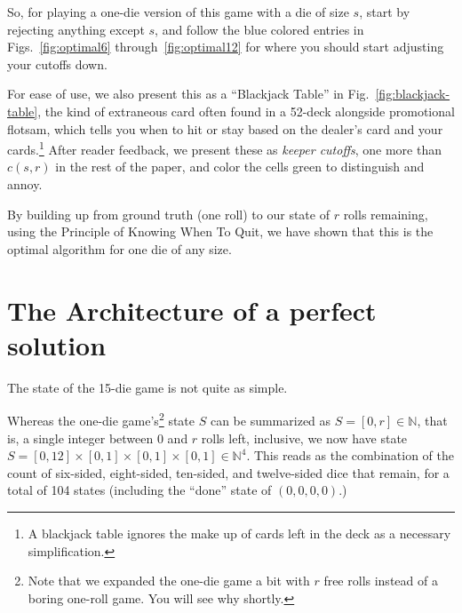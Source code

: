 \documentclass[11pt, oneside]{article} 	%
\begin{document}
So, for playing a one-die version of this game with a die of size $s$, start by rejecting anything except $s$, and follow the blue colored entries in Figs.~\ref{fig:optimal6} through~\ref{fig:optimal12} for where you should start adjusting your cutoffs down.

For ease of use, we also present this as a ``Blackjack Table'' in Fig.~\ref{fig:blackjack-table}, the kind of extraneous card often found in a 52-deck alongside promotional flotsam, which tells you when to hit or stay based on the dealer's card and your cards.\footnote{A blackjack table ignores the make up of cards left in the deck as a necessary simplification.}  After reader feedback, we present these as \emph{keeper cutoffs}, one more than $c(s,r)$ in the rest of the paper, and color the cells green to distinguish and annoy.

By building up from ground truth (one roll) to our state of $r$ rolls remaining, using the Principle of Knowing When To Quit, we have shown that this is the optimal algorithm for one die of any size.

\section{The Architecture of a perfect solution} \label{section:solve-perfect}

The state of the 15-die game is not quite as simple.

Whereas the one-die game's\footnote{Note that we expanded the one-die game a bit with $r$ free rolls instead of a boring one-roll game. You will see why shortly.} state $S$  can be summarized as $S = [0,r] \in \mathbb{N}$, that is, a single integer between $0$ and $r$ rolls left, inclusive, we now have state $S = [0,12] \times [0,1] \times [0,1] \times [0,1] \in \mathbb{N}^4$. This reads as the combination of the count of six-sided, eight-sided, ten-sided, and twelve-sided dice that remain, for a total of 104 states (including the ``done'' state of $(0,0,0,0)$.)
\end{document}
